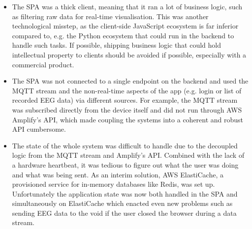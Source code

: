 \begin{itemize}
  \item The SPA was a thick client, meaning that it ran a lot of business logic, such as filtering raw data for real-time visualisation. This was another technological misstep, as the client-side JavaScript ecosystem is far inferior compared to, e.g. the Python ecosystem that could run in the backend to handle such tasks. If possible, shipping business logic that could hold intellectual property to clients should be avoided if possible, especially with a commercial product.
  \item The SPA was not connected to a single endpoint on the backend and used the MQTT stream and the non-real-time aspects of the app (e.g. login or list of recorded EEG data) via different sources. For example, the MQTT stream was subscribed directly from the device itself and did not run through AWS Amplify's API, which made coupling the systems into a coherent and robust API cumbersome.
  \item The state of the whole system was difficult to handle due to the decoupled logic from the MQTT stream and Amplify's API. Combined with the lack of a hardware heartbeat, it was tedious to figure out what the user was doing and what was being sent. As an interim solution, AWS ElastiCache, a provisioned service for in-memory databases like Redis, was set up. Unfortunately the application state was now both handled in the SPA and simultaneously on ElastiCache which enacted even new problems such as sending EEG data to the void if the user closed the browser during a data stream.
\end{itemize}
